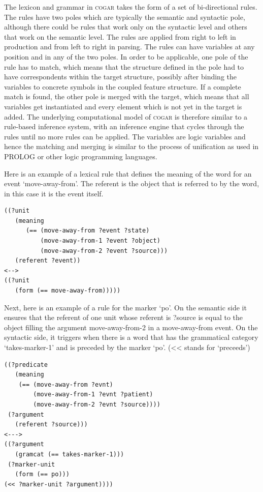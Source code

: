 The lexicon and grammar in \textsc{cogar} takes the form of a set of bi-directional rules. The rules have two poles 
which are typically the semantic and syntactic pole, although there could be rules that work only on the 
syntactic level and others that work on the semantic level. The rules are applied 
from right to left in production and from left to right in parsing. 
The rules can have variables at any position and in any of the two poles. In order to be applicable, 
one pole of the rule has to match, which means that the structure defined in the pole had to 
have correspondents within the target structure, possibly after binding the variables to concrete 
symbols in the coupled feature structure. If a complete match is 
found, the other pole is merged with the target, which means that all variables get instantiated and every 
element which is not yet in the target is added. The underlying computational model of \textsc{cogar}  
is therefore similar to a rule-based inference system, with an inference engine that cycles through the rules until 
no more rules can be applied. The variables are logic variables and hence the matching and merging is similar 
to the process of unification as used in PROLOG or other logic programming languages. 

Here is an example of a lexical rule that defines the meaning of the word for an event `move-away-from'. The referent is 
the object that is referred to by the word, in this case it is the event itself. 
\clearpage
\begin{verbatim}
((?unit 
   (meaning
      (== (move-away-from ?event ?state)
          (move-away-from-1 ?event ?object)
          (move-away-from-2 ?event ?source)))
   (referent ?event)) 
<-->
((?unit
   (form (== move-away-from)))))
\end{verbatim}
Next, here is an example of a rule for the marker `po'. On the semantic side it ensures that the referent of one unit 
whose referent is ?source is equal to the object filling the argument move-away-from-2 in a move-away-from event. 
On the syntactic side, it triggers when there is a word that has the grammatical category `takes-marker-1' and 
is preceded by the marker `po'. (<< stands for `preceeds') 
\begin{verbatim}
((?predicate 
   (meaning
    (== (move-away-from ?evnt)
        (move-away-from-1 ?evnt ?patient)
        (move-away-from-2 ?evnt ?source))))
 (?argument
   (referent ?source))) 
<---> 
((?argument
   (gramcat (== takes-marker-1)))
 (?marker-unit
   (form (== po))) 
(<< ?marker-unit ?argument))))
\end{verbatim}

